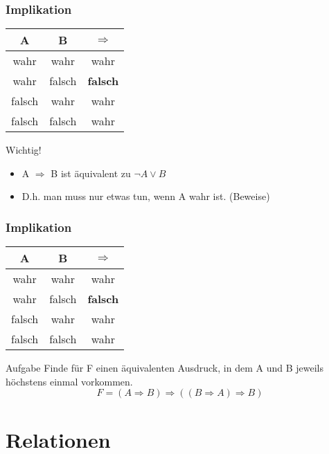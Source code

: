 \documentclass{beamer}
\begin{document}
\begin {frame} 
	\frametitle {Implikation}
	\begin{center}
		\begin{tabular}{|c|c||c| }
			\hline
			A 		&  B 		& $\Rightarrow$ 	\\
			\hline
			wahr 		& wahr 	& wahr	\\
			\hline
			wahr 		& falsch 	& \textbf{falsch}	\\
			\hline
			falsch 		& wahr 	& wahr	\\
			\hline
			falsch 		& falsch 	& wahr	\\
			\hline
		\end{tabular}
	\end{center}

	\begin{alertblock}{Wichtig!}
		\begin{itemize}
			\item A $\Rightarrow$ B ist äquivalent zu \(\neg A\vee B\)
			\item D.h. man muss nur etwas tun, wenn A wahr ist. (Beweise)
		\end{itemize}
	\end{alertblock}
\end{frame}

\begin {frame} 
	\frametitle {Implikation}
	\begin{center}
		\begin{tabular}{|c|c||c| }
			\hline
			A 		&  B 		& $\Rightarrow$ 	\\
			\hline
			wahr 		& wahr 	& wahr	\\
			\hline
			wahr 		& falsch 	& \textbf{falsch}	\\
			\hline
			falsch 		& wahr 	& wahr	\\
			\hline
			falsch 		& falsch 	& wahr	\\
			\hline
		\end{tabular}
	\end{center}
	\begin{exampleblock}{Aufgabe}
		Finde für F einen äquivalenten Ausdruck, in dem A und B jeweils höchstens einmal vorkommen.
		\begin{displaymath}
			F = (A\Rightarrow B) \Rightarrow ((B\Rightarrow A) \Rightarrow B)
		\end{displaymath}
	\end{exampleblock}
\end{frame}

\section{Relationen}
\end{document}
